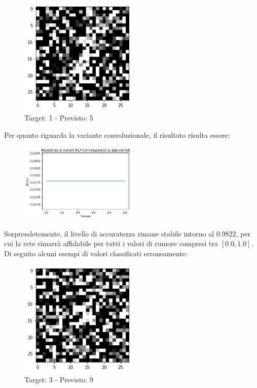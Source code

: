 \documentclass[12pt, a4paper]{article}
\begin{document}
\begin{figure}[H]
    \centering
    \caption{Target: 1 - Previsto: 5}
    \includegraphics[width=0.5\textwidth]{ErrClass5.png}
\end{figure}

Per quanto riguarda la variante convoluzionale, il risultato risulta essere:
\begin{figure}[H]
    \centering
    \includegraphics[width=0.50\textwidth]{TPConv.png}
\end{figure}

Sorprendetemente, il livello di accuratezza rimane stabile intorno al \(0.9822\), per cui la rete rimarrà affidabile per tutti i valori di rumore compresi tra \([0.0, 1.0]\).\\
Di seguito alcuni esempi di valori classificati erroneamente:
\begin{figure}[H]
    \centering
    \caption{Target: 3 - Previsto: 9}
    \includegraphics[width=0.5\textwidth]{ErrConv1.png}
\end{figure}
\end{document}
